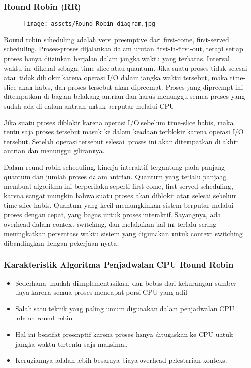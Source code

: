 \documentclass[12pt]{article}
\begin{document}
	\subsubsection{Round Robin (RR)}
        \begin{figure} [h]
        \centering
        \texttt{[image: assets/Round Robin diagram.jpg]}
        \label{fig:diagram}
        \end{figure}
		Round robin scheduling adalah versi preemptive dari first-come, first-served scheduling. Proses-proses dijalankan dalam urutan first-in-first-out, tetapi setiap proses hanya diizinkan berjalan dalam jangka waktu yang terbatas. Interval waktu ini dikenal sebagai time-slice atau quantum. Jika suatu proses tidak selesai atau tidak diblokir karena operasi I/O dalam jangka waktu tersebut, maka time-slice akan habis, dan proses tersebut akan dipreempt. Proses yang dipreempt ini ditempatkan di bagian belakang antrian dan harus menunggu semua proses yang sudah ada di dalam antrian untuk berputar melalui CPU
		\par Jika suatu proses diblokir karena operasi I/O sebelum time-slice habis, maka tentu saja proses tersebut masuk ke dalam keadaan terblokir karena operasi I/O tersebut. Setelah operasi tersebut selesai, proses ini akan ditempatkan di akhir antrian dan menunggu gilirannya.
		\par Dalam round robin scheduling, kinerja interaktif tergantung pada panjang quantum dan jumlah proses dalam antrian. Quantum yang terlalu panjang membuat algoritma ini berperilaku seperti first come, first served scheduling, karena sangat mungkin bahwa suatu proses akan diblokir atau selesai sebelum time-slice habis. Quantum yang kecil memungkinkan sistem berputar melalui proses dengan cepat, yang bagus untuk proses interaktif. Sayangnya, ada overhead dalam context switching, dan melakukan hal ini terlalu sering meningkatkan persentase waktu sistem yang digunakan untuk context switching dibandingkan dengan pekerjaan nyata.
		
		\subsubsection*{Karakteristik Algoritma Penjadwalan CPU Round Robin}
		\begin{itemize}
			\item Sederhana, mudah diimplementasikan, dan bebas dari kekurangan sumber daya karena semua proses mendapat porsi CPU yang adil.
			\item Salah satu teknik yang paling umum digunakan dalam penjadwalan CPU adalah round robin.
			\item Hal ini bersifat preemptif karena proses hanya ditugaskan ke CPU untuk jangka waktu tertentu saja maksimal.
			\item Kerugiannya adalah lebih besarnya biaya overhead pelestarian konteks.
		\end{itemize}
		
\end{document}
